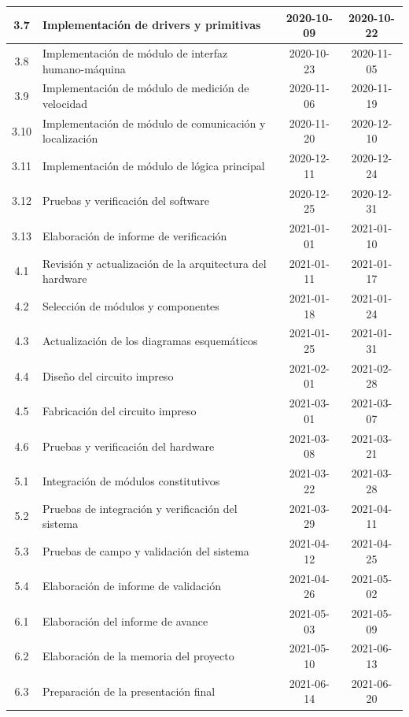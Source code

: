 \documentclass[11pt]{charter}
\begin{document}
\begin{table}[htpb]
\begin{tabularx}{\linewidth}{@{}|c|X|c|c|@{}}
  3.7  & Implementación de drivers y primitivas                   & 2020-10-09 & 2020-10-22 \\ \hline
  3.8  & Implementación de módulo de interfaz humano-máquina      & 2020-10-23 & 2020-11-05 \\ \hline
  3.9  & Implementación de módulo de medición de velocidad        & 2020-11-06 & 2020-11-19 \\ \hline
  3.10 & Implementación de módulo de comunicación y localización  & 2020-11-20 & 2020-12-10 \\ \hline
  3.11 & Implementación de módulo de lógica principal             & 2020-12-11 & 2020-12-24 \\ \hline
  3.12 & Pruebas y verificación del software                      & 2020-12-25 & 2020-12-31 \\ \hline
  3.13 & Elaboración de informe de verificación                   & 2021-01-01 & 2021-01-10 \\ \hline
  4.1  & Revisión y actualización de la arquitectura del hardware & 2021-01-11 & 2021-01-17 \\ \hline
  4.2  & Selección de módulos y componentes                       & 2021-01-18 & 2021-01-24 \\ \hline
  4.3  & Actualización de los diagramas esquemáticos              & 2021-01-25 & 2021-01-31 \\ \hline
  4.4  & Diseño del circuito impreso                              & 2021-02-01 & 2021-02-28 \\ \hline
  4.5  & Fabricación del circuito impreso                         & 2021-03-01 & 2021-03-07 \\ \hline
  4.6  & Pruebas y verificación del hardware                      & 2021-03-08 & 2021-03-21 \\ \hline
  5.1  & Integración de módulos constitutivos                     & 2021-03-22 & 2021-03-28 \\ \hline
  5.2  & Pruebas de integración y verificación del sistema        & 2021-03-29 & 2021-04-11 \\ \hline
  5.3 & Pruebas de campo y validación del sistema                 & 2021-04-12 & 2021-04-25 \\ \hline
  5.4 & Elaboración de informe de validación                      & 2021-04-26 & 2021-05-02 \\ \hline
  6.1 & Elaboración del informe de avance                         & 2021-05-03 & 2021-05-09 \\ \hline
  6.2 & Elaboración de la memoria del proyecto                    & 2021-05-10 & 2021-06-13 \\ \hline
  6.3 & Preparación de la presentación final                      & 2021-06-14 & 2021-06-20 \\ \hline
  \end{tabularx}
  \label{tab:gantt}
\end{table}
\end{document}
